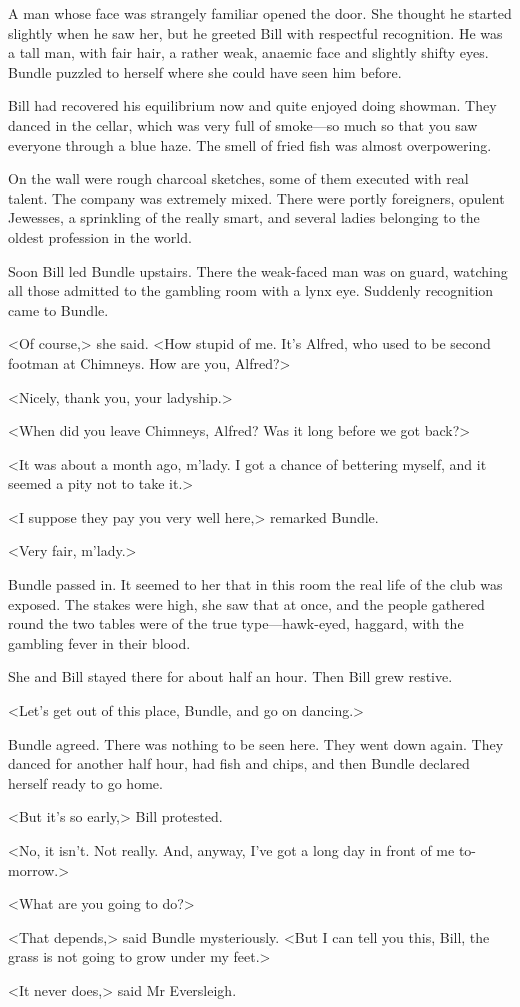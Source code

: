 A man whose face was strangely familiar opened the door. She thought he started slightly when he saw her, but he greeted Bill with respectful recognition. He was a tall man, with fair hair, a rather weak, anaemic face and slightly shifty eyes. Bundle puzzled to herself where she could have seen him before.

Bill had recovered his equilibrium now and quite enjoyed doing showman. They danced in the cellar, which was very full of smoke—so much so that you saw everyone through a blue haze. The smell of fried fish was almost overpowering.

On the wall were rough charcoal sketches, some of them executed with real talent. The company was extremely mixed. There were portly foreigners, opulent Jewesses, a sprinkling of the really smart, and several ladies belonging to the oldest profession in the world.

Soon Bill led Bundle upstairs. There the weak-faced man was on guard, watching all those admitted to the gambling room with a lynx eye. Suddenly recognition came to Bundle.

<Of course,> she said. <How stupid of me. It's Alfred, who used to be second footman at Chimneys. How are you, Alfred?>

<Nicely, thank you, your ladyship.>

<When did you leave Chimneys, Alfred? Was it long before we got back?>

<It was about a month ago, m'lady. I got a chance of bettering myself, and it seemed a pity not to take it.>

<I suppose they pay you very well here,> remarked Bundle.

<Very fair, m'lady.>

Bundle passed in. It seemed to her that in this room the real life of the club was exposed. The stakes were high, she saw that at once, and the people gathered round the two tables were of the true type—hawk-eyed, haggard, with the gambling fever in their blood.

She and Bill stayed there for about half an hour. Then Bill grew restive.

<Let's get out of this place, Bundle, and go on dancing.>

Bundle agreed. There was nothing to be seen here. They went down again. They danced for another half hour, had fish and chips, and then Bundle declared herself ready to go home.

<But it's so early,> Bill protested.

<No, it isn't. Not really. And, anyway, I've got a long day in front of me to-morrow.>

<What are you going to do?>

<That depends,> said Bundle mysteriously. <But I can tell you this, Bill, the grass is not going to grow under my feet.>

<It never does,> said Mr Eversleigh.